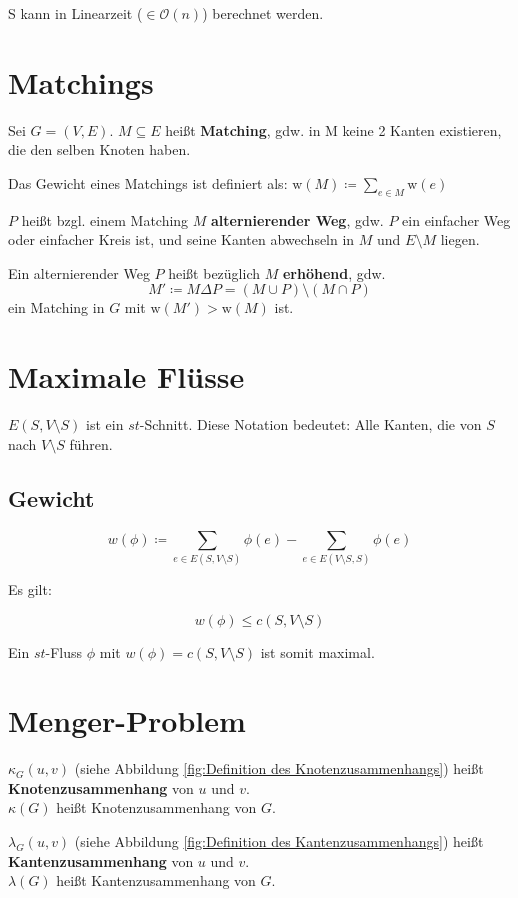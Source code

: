 \documentclass[a4paper,11pt]{report}
\begin{document}
S kann in Linearzeit ($\in \mathcal{O}(n)$) berechnet werden.


\chapter{Matchings}
Sei $G = (V, E)$. $M \subseteq E$ heißt {\bf Matching}, gdw. in M keine 2 Kanten existieren, die den selben Knoten haben.

Das Gewicht eines Matchings ist definiert als: $\text{w}(M) \coloneqq \sum_{e \in M} \text{w}(e)$

$P$ heißt bzgl. einem Matching $M$ \textbf{alternierender Weg}, gdw. $P$ ein einfacher Weg oder einfacher Kreis ist, und seine Kanten abwechseln in $M$ und $E \setminus M$ liegen.

Ein alternierender Weg $P$ heißt bezüglich $M$ \textbf{erhöhend}, gdw.
\[
    M' \coloneqq M \Delta P = (M \cup P) \setminus (M \cap P)
\]
ein Matching in $G$ mit $\text{w}(M') > \text{w}(M)$ ist.


\chapter{Maximale Flüsse}
$E(S, V \setminus S)$ ist ein $st$-Schnitt. Diese Notation bedeutet: Alle Kanten, die von $S$ nach $V \setminus S$ führen.


\section{Gewicht}
\[ w(\phi) \coloneqq \sum_{e \in E(S, V \setminus S)} \phi(e) - \sum_{e \in E(V \setminus S, S)} \phi(e) \]

Es gilt:

\[ w(\phi) \leq c(S, V \setminus S) \]

Ein $st$-Fluss $\phi$ mit $w(\phi) = c(S, V \setminus S)$ ist somit maximal.


\chapter{Menger-Problem}
$\kappa_G(u, v)$ (siehe Abbildung \ref{fig:Definition des Knotenzusammenhangs}) heißt \textbf{Knotenzusammenhang} von $u$ und $v$.\\
$\kappa(G)$ heißt Knotenzusammenhang von $G$.

$\lambda_G(u, v)$ (siehe Abbildung \ref{fig:Definition des Kantenzusammenhangs}) heißt \textbf{Kantenzusammenhang} von $u$ und $v$.\\
$\lambda(G)$ heißt Kantenzusammenhang von $G$.
\end{document}
